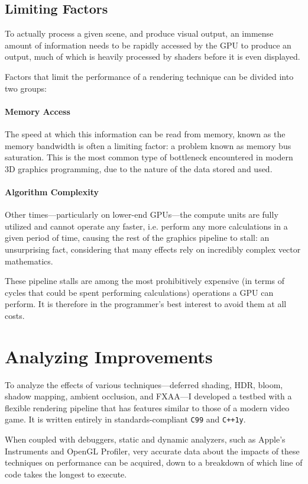 \documentclass[11pt, oneside]{report}
\begin{document}
\subsection{Limiting Factors}
To actually process a given scene, and produce visual output, an immense amount of information needs to be rapidly accessed by the \gls{GPU} to produce an output, much of which is heavily processed by \glspl{shader} before it is even displayed.

Factors that limit the performance of a rendering technique can be divided into two groups:

\paragraph{Memory Access}
The speed at which this information can be read from memory, known as the \gls{memory bandwidth} is often a limiting factor: a problem known as memory bus saturation. This is the most common type of bottleneck encountered in modern 3D graphics programming, due to the nature of the data stored and used.

\paragraph{Algorithm Complexity}
Other times---particularly on lower-end \glspl{GPU}---the \glspl{compute unit} are fully utilized and cannot operate any faster, i.e. perform any more calculations in a given period of time, causing the rest of the \gls{graphics pipeline} to stall: an unsurprising fact, considering that many effects rely on incredibly complex vector mathematics.

These pipeline stalls are among the most prohibitively expensive (in terms of cycles that could be spent performing calculations) operations a \gls{GPU} can perform. It is therefore in the programmer's best interest to avoid them at all costs.

\section{Analyzing Improvements}
To analyze the effects of various techniques—\gls{deferred shading}, \gls{HDR}, \gls{bloom}, \gls{shadow mapping}, \gls{ambient occlusion}, and \gls{FXAA}—I developed a testbed with a flexible rendering pipeline that has features similar to those of a modern video game. It is written entirely in standards-compliant \texttt{C99} and \texttt{C++1y}.

When coupled with debuggers, static and dynamic analyzers, such as Apple's Instruments and \gls{OpenGL} Profiler, very accurate data about the impacts of these techniques on performance can be acquired, down to a breakdown of which line of code takes the longest to execute.
\end{document}
